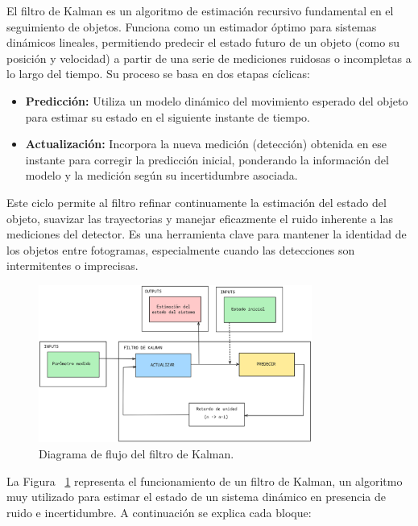 \documentclass[11pt,spanish,listoffigures,listoftables]{tfgetsinf}
\begin{document}
El filtro de Kalman es un algoritmo de estimación recursivo fundamental en el seguimiento de objetos. Funciona como un estimador óptimo para sistemas dinámicos lineales, permitiendo predecir el estado futuro de un objeto (como su posición y velocidad) a partir de una serie de mediciones ruidosas o incompletas a lo largo del tiempo. Su proceso se basa en dos etapas cíclicas:
\begin{itemize}
   \item \textbf{Predicción:} Utiliza un modelo dinámico del movimiento esperado del objeto para estimar su estado en el siguiente instante de tiempo.
   \item \textbf{Actualización:} Incorpora la nueva medición (detección) obtenida en ese instante para corregir la predicción inicial, ponderando la información del modelo y la medición según su incertidumbre asociada.
\end{itemize}
Este ciclo permite al filtro refinar continuamente la estimación del estado del objeto, suavizar las trayectorias y manejar eficazmente el ruido inherente a las mediciones del detector. Es una herramienta clave para mantener la identidad de los objetos entre fotogramas, especialmente cuando las detecciones son intermitentes o imprecisas.



\begin{figure}[H]
   \centering
   \includegraphics[width=0.8\textwidth]{images/estado_del_arte/filtro_de_kalman.png}
   \caption[Diagrama de flujo del filtro de Kalman]{Diagrama de flujo del filtro de Kalman.}
   \label{fig:filtro_de_kalman}
\end{figure}

La Figura ~\ref{fig:filtro_de_kalman} representa el funcionamiento de un filtro de Kalman, un algoritmo muy utilizado para estimar el estado de un sistema dinámico en presencia de ruido e incertidumbre. A continuación se explica cada bloque:
\end{document}
